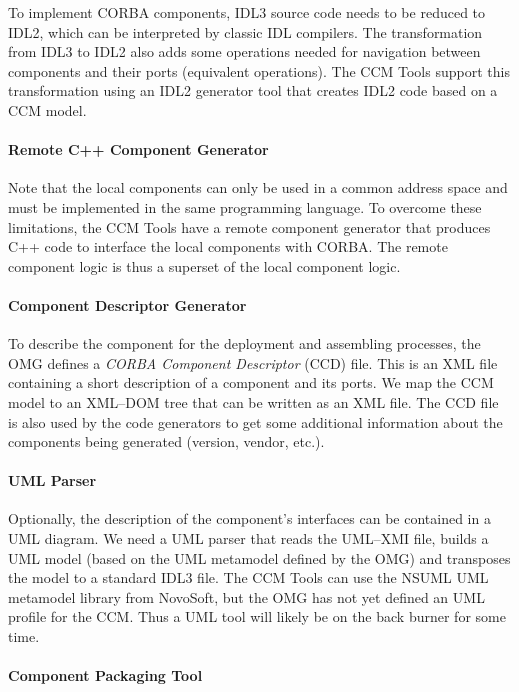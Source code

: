 To implement CORBA components, IDL3 source code needs to be reduced to IDL2,
which can be interpreted by classic IDL compilers. The transformation from IDL3
to IDL2 also adds some operations needed for navigation between components and
their ports (equivalent operations). The CCM Tools support this transformation
using an IDL2 generator tool that creates IDL2 code based on a CCM model.

\paragraph{Remote C++ Component Generator}

Note that the local components can only be used in a common address space and
must be implemented in the same programming language. To overcome these
limitations, the CCM Tools have a remote component generator that produces C++
code to interface the local components with CORBA. The remote component logic is
thus a superset of the local component logic.

\paragraph{Component Descriptor Generator}

To describe the component for the deployment and assembling processes, the OMG
defines a {\it CORBA Component Descriptor} (CCD) file. This is an XML file
containing a short description of a component and its ports. We map the CCM
model to an XML--DOM tree that can be written as an XML file. The CCD file is
also used by the code generators to get some additional information about the
components being generated (version, vendor, etc.).

\paragraph{UML Parser}

Optionally, the description of the component's interfaces can be contained in a
UML diagram. We need a UML parser that reads the UML--XMI file, builds a UML
model (based on the UML metamodel defined by the OMG) and transposes the model
to a standard IDL3 file. The CCM Tools can use the NSUML UML metamodel library
from NovoSoft, but the OMG has not yet defined an UML profile for the CCM. Thus
a UML tool will likely be on the back burner for some time.

\paragraph{Component Packaging Tool}

